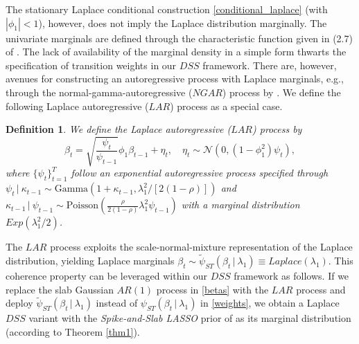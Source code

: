 \documentclass[ba]{imsart}
\numberwithin{equation}{section}
\theoremstyle{plain}
\def\C {\,|\:}
\def\C {\,|\:}
\newtheorem{definition}{Definition}
\begin{document}
The stationary Laplace conditional construction \eqref{conditional_laplace} (with $|\phi_1|<1$), however, does not  imply the Laplace distribution marginally. The univariate marginals are defined through the characteristic function given in (2.7) of \cite{andel}. The lack of availability of the marginal density in a simple form thwarts the specification of transition weights in our $DSS$ framework. There are, however, avenues for constructing an autoregressive process with Laplace marginals, e.g., through the normal-gamma-autoregressive  ($NGAR$) process by \cite{kalli_griffin}. We define  the following Laplace autoregressive ($LAR$) process as a special case.

\begin{definition}
We define the Laplace autoregressive ($LAR$) process by
$$
\beta_t=\sqrt{\frac{\psi_t}{\psi_{t-1}}}\phi_1\beta_{t-1}+\eta_t,\quad \eta_t\sim\mathcal{N}\left(0,(1-\phi_1^2)\psi_t\right),
$$
where $\{\psi_t\}_{t=1}^T$ follow an exponential autoregressive process specified through $\psi_t\C\kappa_{t-1}\sim \mathrm{Gamma}(1+\kappa_{t-1},\lambda_1^2/[2(1-\rho)])$
 and $\kappa_{t-1}\C\psi_{t-1}\sim\mathrm{Poisson}\left(\frac{\rho}{2(1-\rho)}\lambda_1^2\psi_{t-1}\right)$ with a marginal distribution $Exp(\lambda_1^2/2)$.
 \end{definition}
The $LAR$ process exploits the scale-normal-mixture representation of the Laplace distribution, yielding  Laplace marginals  $\beta_t\sim \widetilde{\psi}_{ST}(\beta_t\C\lambda_1)\equiv Laplace(\lambda_1)$.  This coherence property can be leveraged within our $DSS$ framework as follows. If we replace the slab Gaussian $AR(1)$ process in \eqref{betas} with the $LAR$ process and 
deploy $\widetilde{\psi}_{ST}(\beta_t\C\lambda_1)$ instead of ${\psi}_{ST}(\beta_t\C\lambda_1)$ in  \eqref{weights}, we obtain a Laplace $DSS$ variant with the {\sl Spike-and-Slab LASSO} prior of \cite{rockova15} as its marginal distribution (according to Theorem \ref{thm1}).
\end{document}
